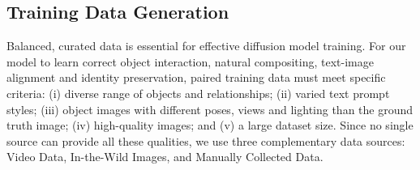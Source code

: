 
\subsection{Training Data Generation}
\label{sec:datageneration}

Balanced, curated data is essential for effective diffusion model training. For our model to learn correct object interaction, natural compositing, text-image alignment and identity preservation, paired training data must meet specific criteria: (i) diverse range of objects and relationships; (ii) varied text prompt styles; (iii) object images with different poses, views and lighting than the ground truth image; (iv) high-quality images; and (v) a large dataset size. Since no single source can provide all these qualities, we use three complementary data sources: Video Data, In-the-Wild Images, and Manually Collected Data. %


